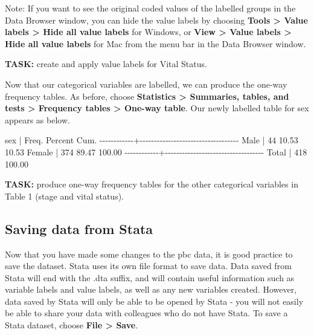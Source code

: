 \documentclass[
]{memoir}
\newenvironment{Shaded}{\begin{snugshade}}{\end{snugshade}}
\newcommand{\NormalTok}[1]{#1}
\begin{document}
Note: If you want to see the original coded values of the labelled groups in the Data Browser window, you can hide the value labels by choosing \textbf{Tools \textgreater{} Value labels \textgreater{} Hide all value labels} for Windows, or \textbf{View \textgreater{} Value labels \textgreater{} Hide all value labels} for Mac from the menu bar in the Data Browser window.

\textbf{TASK:} create and apply value labels for Vital Status.

Now that our categorical variables are labelled, we can produce the one-way frequency tables. As before, choose \textbf{Statistics \textgreater{} Summaries, tables, and tests \textgreater{} Frequency tables \textgreater{} One-way table}. Our newly labelled table for sex appears as below.

\begin{Shaded}
\begin{Highlighting}[]
\NormalTok{        sex |      Freq.     Percent        Cum.}
\NormalTok{{-}{-}{-}{-}{-}{-}{-}{-}{-}{-}{-}{-}+{-}{-}{-}{-}{-}{-}{-}{-}{-}{-}{-}{-}{-}{-}{-}{-}{-}{-}{-}{-}{-}{-}{-}{-}{-}{-}{-}{-}{-}{-}{-}{-}{-}{-}{-}}
\NormalTok{       Male |         44       10.53       10.53}
\NormalTok{     Female |        374       89.47      100.00}
\NormalTok{{-}{-}{-}{-}{-}{-}{-}{-}{-}{-}{-}{-}+{-}{-}{-}{-}{-}{-}{-}{-}{-}{-}{-}{-}{-}{-}{-}{-}{-}{-}{-}{-}{-}{-}{-}{-}{-}{-}{-}{-}{-}{-}{-}{-}{-}{-}{-}}
\NormalTok{      Total |        418      100.00}
\end{Highlighting}
\end{Shaded}

\textbf{TASK:} produce one-way frequency tables for the other categorical variables in Table 1 (stage and vital status).

\hypertarget{saving-data-from-stata}{%
\subsection{Saving data from Stata}\label{saving-data-from-stata}}

Now that you have made some changes to the pbc data, it is good practice to save the dataset. Stata uses its own file format to save data. Data saved from Stata will end with the .dta suffix, and will contain useful information such as variable labels and value labels, as well as any new variables created. However, data saved by Stata will only be able to be opened by Stata - you will not easily be able to share your data with colleagues who do not have Stata. To save a Stata dataset, choose \textbf{File \textgreater{} Save}.
\end{document}
